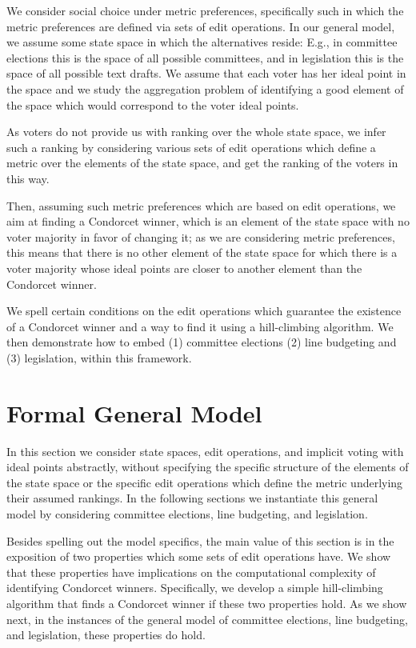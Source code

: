 \documentclass[sigconf]{aamas}  %
\begin{document}
We consider social choice under metric preferences, specifically such in which the metric preferences are defined via sets of edit operations.
In our general model, we assume some state space in which the alternatives reside:
  E.g., in committee elections this is the space of all possible committees, and in legislation this is the space of all possible text drafts.
We assume that each voter has her ideal point in the space and we study the aggregation problem of identifying a good element of the space which would correspond to the voter ideal points.

As voters do not provide us with ranking over the whole state space, we infer such a ranking by considering various sets of edit operations which define a metric over the elements of the state space, and get the ranking of the voters in this way.

Then, assuming such metric preferences which are based on edit operations, we aim at finding a Condorcet winner, which is an element of the state space with no voter majority in favor of changing it; as we are considering metric preferences, this means that there is no other element of the state space for which there is a voter majority whose ideal points are closer to another element than the Condorcet winner.

We spell certain conditions on the edit operations which guarantee the existence of a Condorcet winner and a way to find it using a hill-climbing algorithm. We then demonstrate how to embed (1) committee elections (2) line budgeting and (3) legislation, within this framework.


\section{Formal General Model}

In this section we consider state spaces, edit operations, and implicit voting with ideal points abstractly, without specifying the specific structure of the elements of the state space or the specific edit operations which define the metric underlying their assumed rankings.
%
In the following sections we instantiate this general model by considering committee elections, line budgeting, and legislation.

Besides spelling out the model specifics, the main value of this section is in the exposition of two properties which some sets of edit operations have.  We show that these properties have implications on the computational complexity of identifying Condorcet winners.
Specifically, we develop a simple hill-climbing algorithm that  finds a Condorcet winner if these two properties hold.
%
As we show next, in the instances of the general model of committee elections, line budgeting, and legislation, these properties do hold.
\end{document}
